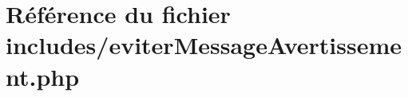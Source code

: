 \hypertarget{eviter_message_avertissement_8php}{}\section{Référence du fichier includes/eviter\+Message\+Avertissement.php}
\label{eviter_message_avertissement_8php}
